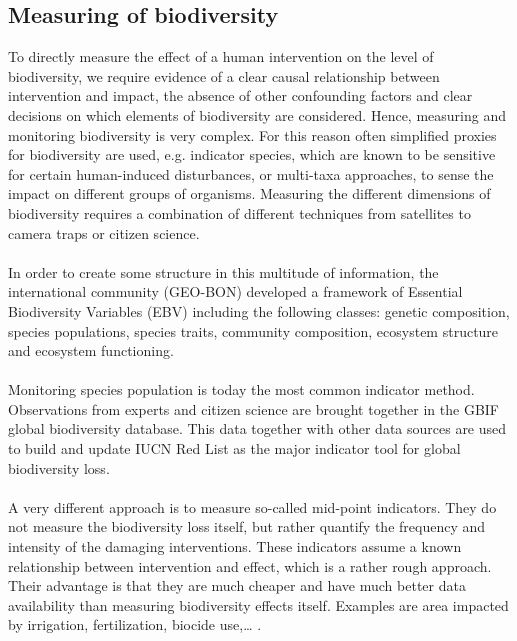 \documentclass[../summary.tex]{subfiles}
\begin{document}
	\subsection{Measuring of biodiversity}
	To directly measure the effect of a human intervention on the level of biodiversity, we require evidence of a clear causal relationship between intervention and impact, the absence of other confounding factors and clear decisions on which elements of biodiversity are considered. Hence, measuring and monitoring biodiversity is very complex. For this reason often simplified proxies for biodiversity are used, e.g. indicator species, which are known to be sensitive for certain human-induced disturbances, or multi-taxa approaches, to sense the impact on different groups of organisms. Measuring the different dimensions of biodiversity requires a combination of different techniques from satellites to camera traps or citizen science. 
	\\
	\\
	In order to create some structure in this multitude of information, the international community (GEO-BON) developed a framework of Essential Biodiversity Variables (EBV) including the following classes: genetic composition, species populations,  species traits, community composition, ecosystem structure and ecosystem functioning.
	\\
	\\
	Monitoring species population is today the most common indicator method. Observations from experts and citizen science are brought together in the GBIF global biodiversity database. This data together with other data sources are used to build and update IUCN Red List as the major indicator tool for global biodiversity loss.
	\\
	\\
	A very different approach is to measure so-called mid-point indicators. They do not measure the biodiversity loss itself, but rather quantify the frequency and intensity of the damaging interventions. These indicators assume a known relationship between intervention and effect, which is a rather rough approach. Their advantage is that they are much cheaper and have much better data availability than measuring biodiversity effects itself. Examples are area impacted by irrigation, fertilization, biocide use,… .
	
\end{document}
